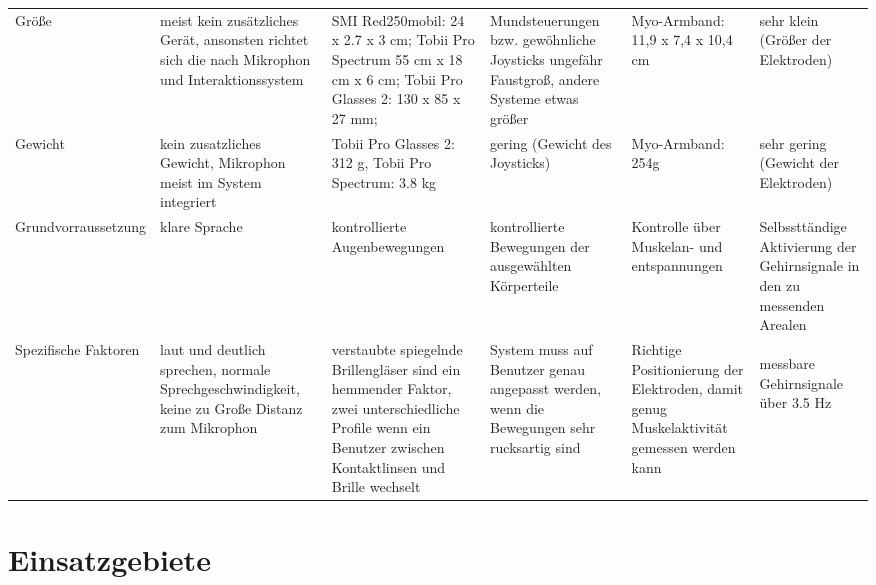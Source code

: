 \begin{landscape}
\begin{longtable}{|p{3cm}|p{3cm}|p{3cm}|p{3cm}|p{3cm}|p{3cm}|}
Größe                   & meist kein zusätzliches Gerät, ansonsten richtet sich die nach Mikrophon und Interaktionssystem & SMI Red250mobil: 24 x 2.7 x 3 cm; Tobii Pro Spectrum 55 cm x 18 cm x 6 cm; Tobii Pro Glasses 2: 130 x 85 x 27 mm;                                         & Mundsteuerungen bzw. gewöhnliche Joysticks ungefähr Faustgroß, andere Systeme etwas größer                                                 & Myo-Armband: 11,9 x 7,4 x 10,4 cm                                                        & sehr klein (Größer der Elektroden)                                       \\
Gewicht                 & kein zusatzliches Gewicht, Mikrophon meist im System integriert                                 & Tobii Pro Glasses 2:  312 g, Tobii Pro Spectrum: 3.8 kg                                                                                                   & gering (Gewicht des Joysticks)                                                                                                             & Myo-Armband: 254g                                                                        & sehr gering (Gewicht der Elektroden)                                     \\
Grundvorraussetzung     & klare Sprache                                                                                   & kontrollierte Augenbewegungen                                                                                                                             & kontrollierte Bewegungen der ausgewählten Körperteile                                                                                      & Kontrolle über Muskelan- und entspannungen                                               & Selbssttändige Aktivierung der Gehirnsignale in den zu messenden Arealen \\
Spezifische Faktoren    & laut und deutlich sprechen, normale Sprechgeschwindigkeit, keine zu Große Distanz zum Mikrophon & verstaubte spiegelnde Brillengläser sind ein hemmender Faktor, zwei unterschiedliche Profile wenn ein Benutzer zwischen Kontaktlinsen und Brille wechselt & System muss auf Benutzer genau angepasst werden, wenn die Bewegungen sehr rucksartig sind                                                  & Richtige Positionierung der Elektroden, damit genug Muskelaktivität gemessen werden kann & messbare Gehirnsignale über 3.5 Hz                                      

\label{tab:matrix} 
\end{longtable}
\end{landscape}



\section{Einsatzgebiete}





 




